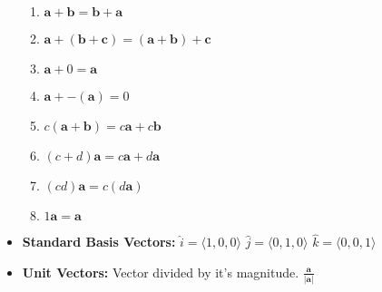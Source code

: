 \documentclass{report}
\begin{document}
\begin{itemize}
			\begin{enumerate}\addtolength{\leftskip}{4em}
				\item \large$\mathbf{a}+\mathbf{b}=\mathbf{b}+\mathbf{a}$
				\item \large$\mathbf{a}+(\mathbf{b}+\mathbf{c})=(\mathbf{a}+\mathbf{b})+\mathbf{c}$
				\item \large$\mathbf{a}+0=\mathbf{a}$
				\item \large$\mathbf{a}+-(\mathbf{a})=0$
				\item \large$c(\mathbf{a+b})=c\mathbf{a}+c\mathbf{b}$
				\item \large$(c+d)\mathbf{a}=c\mathbf{a}+d\mathbf{a}$
				\item \large$(cd)\mathbf{a}=c(d\mathbf{a})$
				\item \large$1\mathbf{a}=\mathbf{a}$
			\end{enumerate}
			\item \textbf{Standard Basis Vectors:}
			\subitem \large$\hat{i}=\langle 1,0,0 \rangle$
			\subitem \large$\hat{j}=\langle 0,1,0 \rangle$
			\subitem \large$\hat{k}=\langle 0,0,1 \rangle$
			\item \textbf{Unit Vectors:}
			\subitem Vector divided by it's magnitude. \huge$\frac{\mathbf{a}}{|\mathbf{a}|}$
 		\end{itemize}
\end{document}
